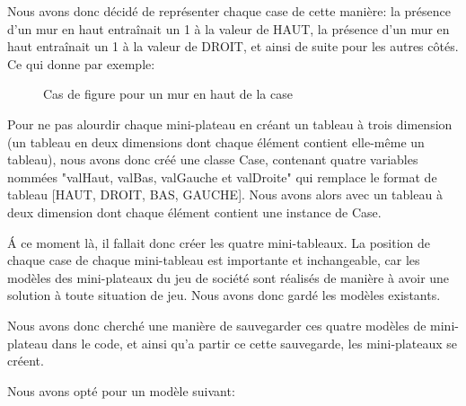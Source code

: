 \documentclass[a4paper, 12pt]{article}
\begin{document}
            Nous avons donc décidé de représenter chaque case de cette manière: la présence d'un mur en haut entraînait un 1 à la valeur de HAUT, la présence d'un mur en haut entraînait un 1 à la valeur de DROIT, et ainsi de suite pour les autres côtés. Ce qui donne par exemple:
            
            \vspace{0.5cm}
            
            \begin{figure}[H]
                \centering
                \caption{Cas de figure pour un mur en haut de la case}
            \end{figure}
            
    
            Pour ne pas alourdir chaque mini-plateau en créant un tableau à trois dimension (un tableau en deux dimensions dont chaque élément contient elle-même un tableau), nous avons donc créé une classe Case, contenant quatre variables nommées "valHaut, valBas, valGauche et valDroite" qui remplace le format de tableau [HAUT, DROIT, BAS, GAUCHE]. Nous avons alors avec un tableau à deux dimension dont chaque élément contient une instance de Case.
            
            Á ce moment là, il fallait donc créer les quatre mini-tableaux. La position de chaque case de chaque mini-tableau est importante et inchangeable, car les modèles des mini-plateaux du jeu de société sont réalisés de manière à avoir une solution à toute situation de jeu. Nous avons donc gardé les modèles existants. 
            
            Nous avons donc cherché une manière de sauvegarder ces quatre modèles de mini-plateau dans le code, et ainsi qu'a partir ce cette sauvegarde, les mini-plateaux se créent. 
            
            Nous avons opté pour un modèle suivant:
            \vspace{0.5cm}
            
    
\end{document}
